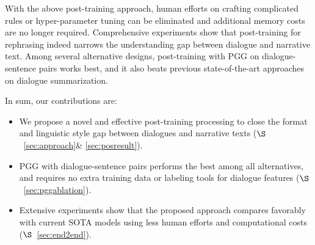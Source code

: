 With the above post-training approach, human efforts on crafting complicated rules or 
hyper-parameter tuning can be eliminated and additional memory costs are no longer required.
Comprehensive experiments show that post-training for rephrasing indeed narrows 
the understanding gap between dialogue and narrative text.  
Among several alternative designs, post-training with PGG on dialogue-sentence pairs works best, 
and it also beats previous state-of-the-art approaches on dialogue summarization.



In sum, our contributions are:
\begin{itemize}
\item We propose a novel and effective post-training processing to close 
the format and linguistic style gap between dialogues and narrative texts ($\S$~\ref{sec:approach}\& \ref{sec:posresult}).
\item PGG with dialogue-sentence pairs performs the best among all alternatives, and requires no extra training data or labeling tools for dialogue features ($\S$~\ref{sec:pggablation}).
\item Extensive experiments show that the proposed approach compares favorably with current SOTA models using less human efforts and computational costs ($\S$~\ref{sec:end2end}).
%
\end{itemize}







